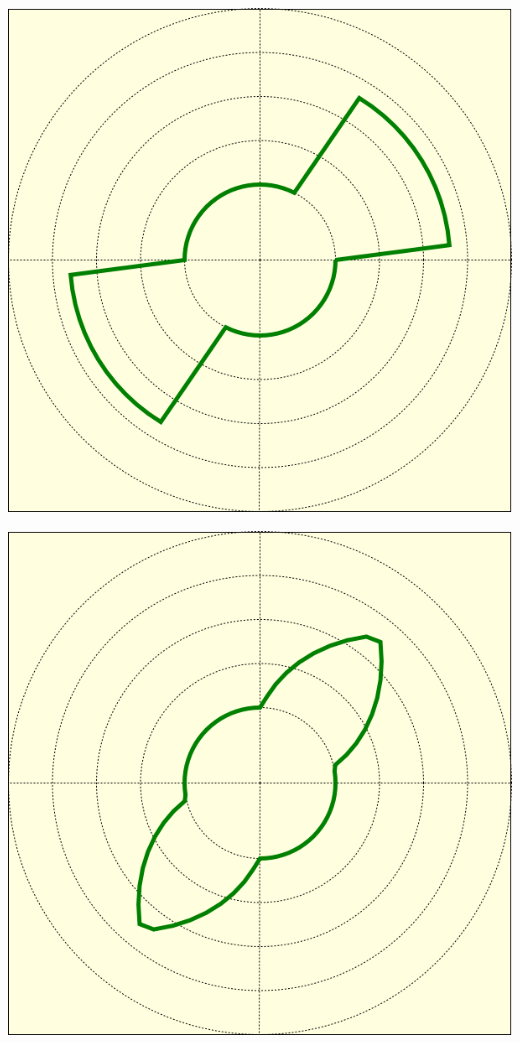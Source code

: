 \documentclass[paper=a4, fleqn]{scrartcl}
\begin{document}
\begin{titlepage}
\includegraphics[scale=0.6]{polar_fn1_plot.png}

\includegraphics[scale=0.6]{polar_fn2_plot.png}


\end{titlepage}
\end{document}
